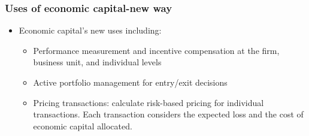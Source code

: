 \subsubsection{Uses of economic capital-new way}
\begin{itemize}
\item Economic capital's new uses including:
    \begin{itemize}
    \item Performance measurement and incentive compensation at the firm, business unit, and individual levels
    \item Active portfolio management for entry/exit decisions
    \item Pricing transactions: calculate risk-based pricing for individual transactions. Each transaction considers the expected loss and the cost of economic capital allocated.
    \end{itemize}
\end{itemize}


